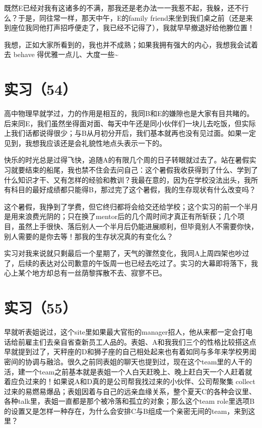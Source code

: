 \documentclass[12pt]{book}
\begin{document}
既然E已经对我有这诸多的不满，那我还是老办法一一我惹不起，我躲，还不行么？于是，同往常一样，那天中午，E的family friend来坐到我们桌之前（还是来到座位我同他打声招呼便走了，我已经不记得了），我就早早撤退好给他滕位置！

我想，正如大家所看到的，我也并不成熟；如果我拥有强大的内心，我想我会试着去 behave 得优雅一点儿、大度一些\textasciitilde{}~


\section{实习（54）}
\label{sec-5-57}

高中物理早就学过，力的作用是相互的，我同B和E的嫌隙也是大家有目共睹的。后来同E，我们虽然坐得面对面、每天中午还是同小伙伴们一块儿去吃饭，但实际上我们话都说得很少；与B从月初分开后，我们基本就再也没有见过面。如果一定见到，我想我应该还是会礼貌性地点头表示一下的。　

快乐的时光总是过得飞快，追随A的有限几个周的日子转眼就过去了。站在暑假实习就要结束的船尾，我也禁不住会去问自己：这个暑假我收获得到了什么、学到了什么知识才干、又有怎样的经验和教训？我最在意的，因为在学校没法出头，我所有科目的最好成绩都只能得B，那过完了这个暑假，我的生存现状有什么改变吗？

这个暑假，我挣到了学费，但它终归都将会给交还给学校；这个实习的前一个半月是用来浪费光阴的；只在换了mentor后的几个周时间才真正有所斩获；几个项目，虽然上手很快、落后别人一个半月后仍能进展顺利，但毕竟别人不需要你快，别人需要的是你去等！那我的生存状况真的有变化么？

实习对我来说就只剩最后一个星期了，天气的骤然变化，我同A上周四架也吵过了，后续的表达对公司歉意的午饭周一也已经去吃过了。实习的大幕即将落下，我心上某个地方却总有一丝荫黎挥散不去、寂寥不已。


\section{实习（55）}
\label{sec-5-58}

早就听表姐说过，这个site里如果最大官衔的manager招人，他从来都一定会打电话给前雇主们去亲自省查新员工人品的。表姐、A和我我们三个的性格比较搭这点早就提到过了，天秤座的D和狮子座的自己相处起来也有着如同与多年来学校男闺密间的协调与融洽。很久之前同表姐的聊天也提到过，现在这个team里的人干的活，建一个team之前基本就是表姐一个人白天赶晚上、晚上赶白天一个人赶着就着应负过来的！如果说A和D真的是公司帮我找过来的小伙伴、公司帮聚集 collect 过来的易燃易爆品；表姐因着与自己的远亲血缘关系，整个夏天C的各种会议里、各种talk里，表姐一直都是那个被冷落和孤立的对象；那么这个team role里选项B的设置又是怎样一种存在，为什么会安排C与B组成一个亲密无间的team，来到这里？
\end{document}
